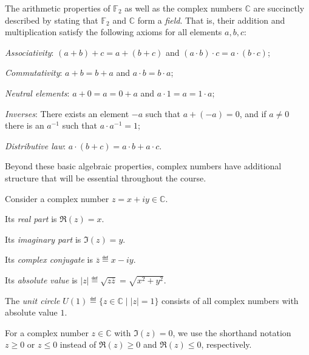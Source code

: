 \documentclass[a4paper, oneside, 12pt]{amsart}
\begin{document}
The arithmetic properties of  \( \mathbb{F}_{2}\) as well as the complex numbers \( \mathbb{C} \) are  succinctly described by stating that \( \mathbb{F}_{2}\) and \( \mathbb{C}\) form a \emph{field}.
That is, their addition and multiplication satisfy the following axioms for all elements \( a, b, c \):
\begin{thmlist}
  \item \emph{Associativity}: \((a + b) + c = a + (b + c)\) and \((a \cdot b) \cdot c = a \cdot (b \cdot c)\);
  \item \emph{Commutativity}: \( a + b = b + a \) and \( a \cdot b = b \cdot a \);
  \item \emph{Neutral elements}: \( a + 0 = a = 0 + a \) and \( a \cdot 1 = a = 1 \cdot a \);
  \item \emph{Inverses}: There exists an element \( -a \) such that \( a + (-a) = 0 \), and if \(a\neq 0\) there is an \( a^{-1}\) such that \( a \cdot a^{-1} = 1 \);
  \item \emph{Distributive law}: \( a \cdot (b + c) = a \cdot b + a \cdot c \).
\end{thmlist}

Beyond these basic algebraic properties, complex numbers have additional structure that will be essential throughout the course.

\begin{definition}\label{def:some-props-of-complex-numbers}
  Consider a complex number \( z = x + iy \in \mathbb{C} \).
  \begin{thmlist}
    \item Its \emph{real part} is \(\Re(z) = x\).
    \item Its \emph{imaginary part} is \(\Im(z) = y\).
    \item Its \emph{complex conjugate} is \(\overline{z}\eqdef x-iy\).
    \item Its \emph{absolute value} is \(|z| \eqdef \sqrt{z\overline{z}} = \sqrt{x^{2}+y^{2}}\).
  \end{thmlist}

  The \emph{unit circle} \(U(1)\eqdef\{z \in \mathbb{C} \mid |z| = 1\}\) consists of all complex numbers with absolute value \(1\).
\end{definition}

\begin{notation}
  For a complex number \(z \in \mathbb{C}\) with \(\Im(z) = 0\), we use the shorthand notation \(z \geq 0\) or \(z\leq 0\) instead of \(\Re(z) \geq 0\) and \(\Re(z) \leq 0\), respectively.
\end{notation}
\end{document}
